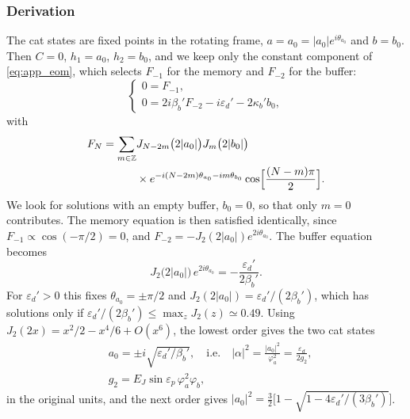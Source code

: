 \documentclass[aps,prx,reprint,floatfix,amsmath,amssymb,longbibliography]{revtex4-2}
\begin{document}
\subsubsection{Derivation}
\label{app:cat_derivation}

The cat states are fixed points in the rotating frame, $a=a_0=|a_0|e^{i\theta_{a_0}}$ and $b=b_0$. Then $C=0$, $h_1=a_0$, $h_2=b_0$, and we keep only the constant component of \cref{eq:app_eom}, which selects $F_{-1}$ for the memory and $F_{-2}$ for the buffer:
\begin{equation}
\begin{cases}
    0 = F_{-1},\\
    0 = 2i\beta_b' F_{-2} - i\varepsilon_d' - 2\kappa_b' b_0,
\end{cases}
\end{equation}
with
\begin{equation}
\begin{split}
    F_N = \sum_{m\in\mathbb Z} &J_{N-2m}\bigl(2|a_0|\bigr)J_m\bigl(2|b_0|\bigr)\\
    &\times e^{-i(N-2m)\theta_{a_0}-im\theta_{b_0}}\cos\Bigl[\frac{(N-m)\pi}{2}\Bigr].
\end{split}
\end{equation}
We look for solutions with an empty buffer, $b_0=0$, so that only $m=0$ contributes. The memory equation is then satisfied identically, since $F_{-1}\propto\cos(-\pi/2)=0$, and $F_{-2}=-J_2(2|a_0|)e^{2i\theta_{a_0}}$. The buffer equation becomes
\begin{equation}
    J_2\bigl(2|a_0|\bigr)\,e^{2i\theta_{a_0}} = -\frac{\varepsilon_d'}{2\beta_b'}.
    \label{eq:app_cat_bessel}
\end{equation}
For $\varepsilon_d'>0$ this fixes $\theta_{a_0}=\pm\pi/2$ and $J_2(2|a_0|)=\varepsilon_d'/(2\beta_b')$, which has solutions only if $\varepsilon_d'/(2\beta_b')\le\max_z J_2(z)\simeq0.49$. Using $J_2(2x)=x^2/2-x^4/6+O(x^6)$, the lowest order gives the two cat states
\begin{equation}
\begin{split}
    &a_0 = \pm i\sqrt{\varepsilon_d'/\beta_b'},
    \quad\text{i.e.}\quad
    |\alpha|^2 = \frac{|a_0|^2}{\varphi_a^2} = \frac{\varepsilon_d}{2g_2},\\
    &g_2 = E_J\sin\varepsilon_p\,\varphi_a^2\varphi_b ,
\end{split}
\label{eq:app_cat}
\end{equation}
in the original units, and the next order gives $|a_0|^2=\tfrac32\bigl[1-\sqrt{1-4\varepsilon_d'/(3\beta_b')}\bigr]$.
\end{document}
